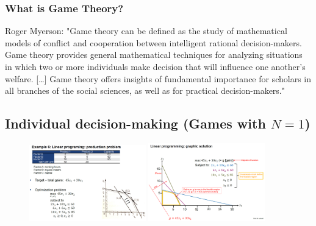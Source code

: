 \subsubsection{What is Game Theory?}

Roger Myerson:
"Game theory can be defined as the study of mathematical
models of conflict and cooperation between intelligent
rational decision-makers. Game theory provides general
mathematical techniques for analyzing situations in which
two or more individuals make decision that will influence one
another’s welfare. […] Game theory offers insights of
fundamental importance for scholars in all branches of the
social sciences, as well as for practical decision-makers."

\subsection{Individual decision-making (Games with $N=1$)}

\begin{example}
\end{example}

\begin{figure}[h]
    \centering
    \includegraphics[width=0.45\textwidth]{Pictures/Linear_programming_1.png}
    \includegraphics[width=0.45\textwidth]{Pictures/Linear_programming_2.png}
\end{figure}

